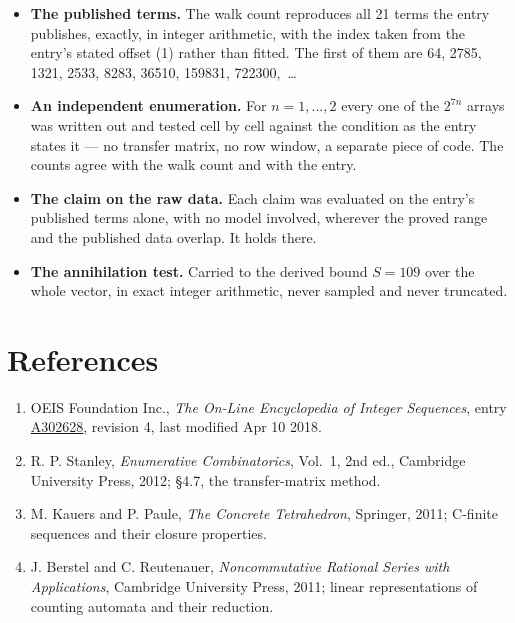 \documentclass[11pt]{article}
\theoremstyle{definition}
\begin{document}
\begin{itemize}

\item {\bfseries The published terms.} The walk count reproduces all 21 terms the entry publishes, exactly, in integer arithmetic, with the index taken from the entry's stated offset (1) rather than fitted. The first of them are 64, 2785, 1321, 2533, 8283, 36510, 159831, 722300,~\dots

\item {\bfseries An independent enumeration.} For $n = 1,\dots,2$ every one of the $2^{7n}$ arrays was written out and tested cell by cell against the condition as the entry states it --- no transfer matrix, no row window, a separate piece of code. The counts agree with the walk count and with the entry.

\item {\bfseries The claim on the raw data.} Each claim was evaluated on the entry's published terms alone, with no model involved, wherever the proved range and the published data overlap. It holds there.

\item {\bfseries The annihilation test.} Carried to the derived bound $S = 109$ over the whole vector, in exact integer arithmetic, never sampled and never truncated.

\end{itemize}

\section{References}

\begin{enumerate}

\item OEIS Foundation Inc., \emph{The On-Line Encyclopedia of Integer Sequences}, entry \href{https://oeis.org/A302628}{A302628}, revision 4, last modified Apr 10 2018.

\item R. P. Stanley, \emph{Enumerative Combinatorics}, Vol.~1, 2nd ed., Cambridge University Press, 2012; \S4.7, the transfer-matrix method.

\item M. Kauers and P. Paule, \emph{The Concrete Tetrahedron}, Springer, 2011; C-finite sequences and their closure properties.

\item J. Berstel and C. Reutenauer, \emph{Noncommutative Rational Series with Applications}, Cambridge University Press, 2011; linear representations of counting automata and their reduction.

\end{enumerate}
\end{document}

